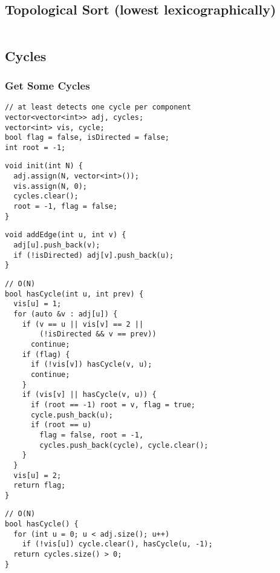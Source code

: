 \documentclass[twoside]{article}
\begin{document}
\begin{multicols*}{2}
\subsectionfont{\large\bfseries\sffamily\underline}
\subsection*{Topological Sort (lowest lexicographically)}
\begin{verbatim}

\end{verbatim}

\subsectionfont{\bfseries\sffamily\centering\LARGE}
\vspace{0em}
\subsection*{Cycles}
\vspace{2em}
\subsubsectionfont{\large\bfseries\sffamily\underline}
\subsubsection*{Get Some Cycles}
\begin{verbatim}
// at least detects one cycle per component
vector<vector<int>> adj, cycles;
vector<int> vis, cycle;
bool flag = false, isDirected = false;
int root = -1;
\end{verbatim}
\vspace{-12pt}
\begin{verbatim}
void init(int N) {
  adj.assign(N, vector<int>());
  vis.assign(N, 0);
  cycles.clear();
  root = -1, flag = false;
}
\end{verbatim}
\vspace{-12pt}
\begin{verbatim}
void addEdge(int u, int v) {
  adj[u].push_back(v);
  if (!isDirected) adj[v].push_back(u);
}
\end{verbatim}
\vspace{-12pt}
\begin{verbatim}
// O(N)
bool hasCycle(int u, int prev) {
  vis[u] = 1;
  for (auto &v : adj[u]) {
    if (v == u || vis[v] == 2 ||
        (!isDirected && v == prev))
      continue;
    if (flag) {
      if (!vis[v]) hasCycle(v, u);
      continue;
    }
    if (vis[v] || hasCycle(v, u)) {
      if (root == -1) root = v, flag = true;
      cycle.push_back(u);
      if (root == u)
        flag = false, root = -1,
        cycles.push_back(cycle), cycle.clear();
    }
  }
  vis[u] = 2;
  return flag;
}
\end{verbatim}
\vspace{-12pt}
\begin{verbatim}
// O(N)
bool hasCycle() {
  for (int u = 0; u < adj.size(); u++)
    if (!vis[u]) cycle.clear(), hasCycle(u, -1);
  return cycles.size() > 0;
}
\end{verbatim}


\end{multicols*}
\end{document}
